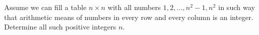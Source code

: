 Assume we can fill a table $n\times n$ with all numbers $1,2,\ldots,n^2-1,n^2$ in such way that arithmetic means of numbers in every row and every column is an integer. Determine all such positive integers $n$.